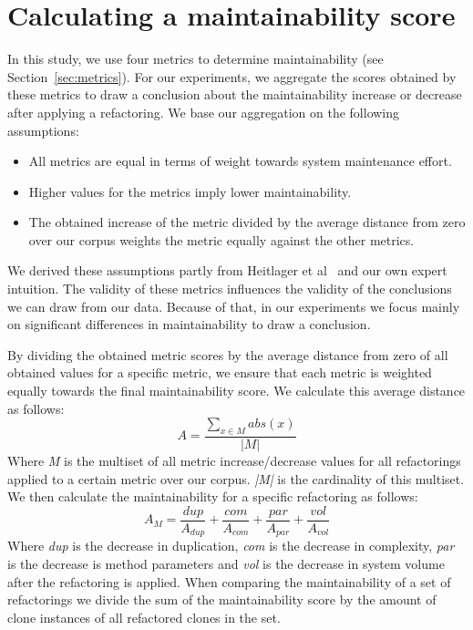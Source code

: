 \section{Calculating a maintainability score}\label{sec:metricformula}
In this study, we use four metrics to determine maintainability (see Section~\ref{sec:metrics}). For our experiments, we aggregate the scores obtained by these metrics to draw a conclusion about the maintainability increase or decrease after applying a refactoring. We base our aggregation on the following assumptions:
\begin{itemize}
  \item All metrics are equal in terms of weight towards system maintenance effort.
  \item Higher values for the metrics imply lower maintainability.
  \item The obtained increase of the metric divided by the average distance from zero over our corpus weights the metric equally against the other metrics.
\end{itemize}
We derived these assumptions partly from Heitlager et al~\cite{heitlager2007practical} and our own expert intuition. The validity of these metrics influences the validity of the conclusions we can draw from our data. Because of that, in our experiments we focus mainly on significant differences in maintainability to draw a conclusion.

By dividing the obtained metric scores by the average distance from zero of all obtained values for a specific metric, we ensure that each metric is weighted equally towards the final maintainability score. We calculate this average distance as follows:
\begin{equation}\label{eq:scoredev}
A = \frac{\sum_{x \in M} abs(x)}{|M|}
\end{equation}
Where \textit{M} is the multiset of all metric increase/decrease values for all refactorings applied to a certain metric over our corpus. \textit{|M|} is the cardinality of this multiset. We then calculate the maintainability for a specific refactoring as follows:
\begin{equation}\label{eq:scoreref}
A_M = \frac{dup}{A_{dup}} + \frac{com}{A_{com}} + \frac{par}{A_{par}} + \frac{vol}{A_{vol}}
\end{equation}
Where \textit{dup} is the decrease in duplication, \textit{com} is the decrease in complexity, \textit{par} is the decrease is method parameters and \textit{vol} is the decrease in system volume after the refactoring is applied. When comparing the maintainability of a set of refactorings we divide the sum of the maintainability score by the amount of clone instances of all refactored clones in the set.

